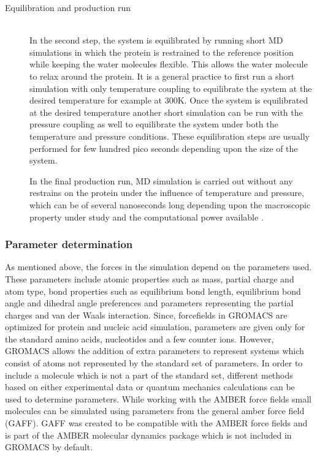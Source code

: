 \begin{description}
		\item[Equilibration and production run] \hfill \\  In the second step, the system is equilibrated by running short MD simulations in which the protein is restrained to the reference position while keeping the water molecules flexible. This allows the water molecule to relax around the protein. %
		It is a general practice to first run a short simulation with only temperature coupling to equilibrate the system at the desired temperature for example at 300K. Once the system is equilibrated at the desired temperature another short simulation can be run with the pressure coupling as well to equilibrate the system under both the temperature and pressure conditions. These equilibration steps are usually performed for few hundred pico seconds depending upon the size of the system. 
		
		In the final production run, MD simulation is carried out without any restrains on the protein under the influence of temperature and pressure, which can be of several nanoseconds long depending upon the macroscopic property under study and the computational power available \parencite{Hess2008a}. 
		\end{description}
		
			\subsubsection{Parameter determination}
			\label{sec:MDparameters}
			As mentioned above, the forces in the simulation depend on the parameters used. These parameters include atomic properties such as mass, partial charge and atom type, bond properties such as equilibrium bond length, equilibrium bond angle and dihedral angle preferences and parameters representing the partial charges  and van der Waals interaction. Since, forcefields in GROMACS are optimized for protein and nucleic acid simulation, parameters are given only for the standard amino acids, nucleotides and a few counter ions. However, GROMACS allows the addition of extra parameters to represent systems which consist of atoms not represented by the standard set of parameters. In order to include a molecule which is not a part of the standard set, different methods based on either experimental data or quantum mechanics calculations can be used to determine parameters. While working with the AMBER force fields small molecules can be simulated using parameters from the general amber force field (GAFF). GAFF was created to be compatible with the AMBER force fields \parencite{Wang2004} and is part of the AMBER molecular dynamics package which is not included in GROMACS by default. 
			
